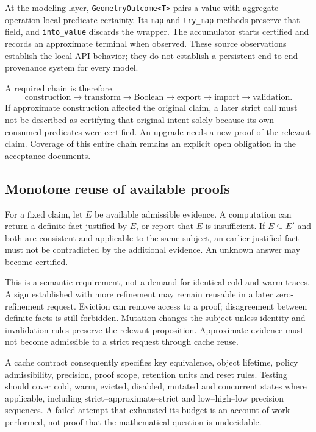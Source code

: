 \documentclass[11pt]{article}
\begin{document}
At the modeling layer, \texttt{GeometryOutcome<T>} pairs a value with aggregate
operation-local predicate certainty. Its \texttt{map} and \texttt{try\_map}
methods preserve that field, and \texttt{into\_value} discards the wrapper.
The accumulator starts certified and records an approximate terminal when
observed. These source observations establish the local API behavior; they
do not establish a persistent end-to-end provenance system for every model.

A required chain is therefore
\[
 \text{construction}\to\text{transform}\to\text{Boolean}\to
 \text{export}\to\text{import}\to\text{validation}.
\]
If approximate construction affected the original claim, a later strict call
must not be described as certifying that original intent solely because its
own consumed predicates were certified. An upgrade needs a new proof of the
relevant claim. Coverage of this entire chain remains an explicit open
obligation in the acceptance documents.

\subsection{Monotone reuse of available proofs}
For a fixed claim, let $E$ be available admissible evidence. A computation can
return a definite fact justified by $E$, or report that $E$ is insufficient.
If $E\subseteq E'$ and both are consistent and applicable to the same subject,
an earlier justified fact must not be contradicted by the additional evidence.
An unknown answer may become certified.

This is a semantic requirement, not a demand for identical cold and warm traces.
A sign established with more refinement may remain reusable in a later
zero-refinement request. Eviction can remove access to a proof; disagreement
between definite facts is still forbidden. Mutation changes the subject unless
identity and invalidation rules preserve the relevant proposition. Approximate
evidence must not become admissible to a strict request through cache reuse.

A cache contract consequently specifies key equivalence, object lifetime,
policy admissibility, precision, proof scope, retention units and reset rules.
Testing should cover cold, warm, evicted, disabled, mutated and concurrent states
where applicable, including strict--approximate--strict and low--high--low
precision sequences. A failed attempt that exhausted its budget is an account
of work performed, not proof that the mathematical question is undecidable.
\end{document}
